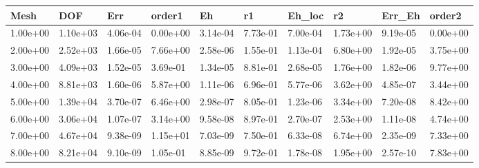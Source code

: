 \begin{tabular}{llllllllll}
Mesh & DOF & Err & order1 & Eh & r1 & Eh_loc & r2 & Err_Eh & order2 \\ 
\hline 
1.00e+00 & 1.10e+03 & 4.06e-04 & 0.00e+00 & 3.14e-04 & 7.73e-01 & 7.00e-04 & 1.73e+00 & 9.19e-05 & 0.00e+00 \\ 
2.00e+00 & 2.52e+03 & 1.66e-05 & 7.66e+00 & 2.58e-06 & 1.55e-01 & 1.13e-04 & 6.80e+00 & 1.92e-05 & 3.75e+00 \\ 
3.00e+00 & 4.09e+03 & 1.52e-05 & 3.69e-01 & 1.34e-05 & 8.81e-01 & 2.68e-05 & 1.76e+00 & 1.82e-06 & 9.77e+00 \\ 
4.00e+00 & 8.81e+03 & 1.60e-06 & 5.87e+00 & 1.11e-06 & 6.96e-01 & 5.77e-06 & 3.62e+00 & 4.85e-07 & 3.44e+00 \\ 
5.00e+00 & 1.39e+04 & 3.70e-07 & 6.46e+00 & 2.98e-07 & 8.05e-01 & 1.23e-06 & 3.34e+00 & 7.20e-08 & 8.42e+00 \\ 
6.00e+00 & 3.06e+04 & 1.07e-07 & 3.14e+00 & 9.58e-08 & 8.97e-01 & 2.70e-07 & 2.53e+00 & 1.11e-08 & 4.74e+00 \\ 
7.00e+00 & 4.67e+04 & 9.38e-09 & 1.15e+01 & 7.03e-09 & 7.50e-01 & 6.33e-08 & 6.74e+00 & 2.35e-09 & 7.33e+00 \\ 
8.00e+00 & 8.21e+04 & 9.10e-09 & 1.05e-01 & 8.85e-09 & 9.72e-01 & 1.78e-08 & 1.95e+00 & 2.57e-10 & 7.83e+00 \\ 
\hline 
\end{tabular}